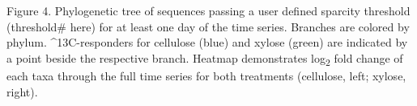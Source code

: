 Figure 4. Phylogenetic tree of sequences passing a user defined sparcity threshold (threshold# here) for at least one day of the time series. Branches are colored by phylum. ^{13}C-responders for cellulose (blue) and xylose (green) are indicated by a point beside the respective branch. Heatmap demonstrates log\textsubscript{2} fold change of each taxa through the full time series for both treatments (cellulose, left; xylose, right).        